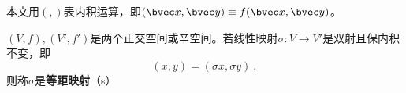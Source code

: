 本文用$(,)$表内积运算，即$(\bvec x,\bvec y)\equiv f(\bvec x,\bvec y) $。
\begin{definition}{}
$(V,f),(V',f')$是两个正交空间或辛空间。若线性映射$\sigma:V\rightarrow V'$是双射且保内积不变，即\begin{equation}
(x,y)=(\sigma x,\sigma y)~,
\end{equation}
则称$\sigma $是\textbf{等距映射}（s）
\end{definition}
